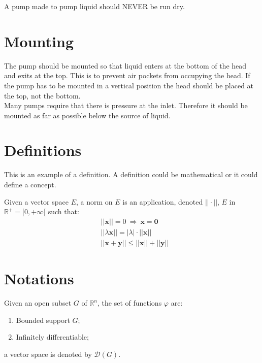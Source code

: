 \documentclass[11pt,fleqn]{book} %
\begin{document}
A pump made to pump liquid should NEVER be run dry.

\section{Mounting}

The pump should be mounted so that liquid enters at the bottom of the head and exits at the top. This is to prevent air pockets from occupying the head. If the pump has to be mounted in a vertical position the head should be placed at the top, not the bottom.\\

Many pumps require that there is pressure at the inlet. Therefore it should be mounted as far as possible below the source of liquid.


\section{Definitions}

This is an example of a definition. A definition could be mathematical or it could define a concept.

\begin{definition}
Given a vector space $E$, a norm on $E$ is an application, denoted $||\cdot||$, $E$ in $\mathbb{R}^+=[0,+\infty[$ such that:
\begin{align}
& ||\mathbf{x}||=0\ \Rightarrow\ \mathbf{x}=\mathbf{0}\\
& ||\lambda \mathbf{x}||=|\lambda|\cdot ||\mathbf{x}||\\
& ||\mathbf{x}+\mathbf{y}||\leq ||\mathbf{x}||+||\mathbf{y}||
\end{align}
\end{definition}


\section{Notations}

\begin{notation}
Given an open subset $G$ of $\mathbb{R}^n$, the set of functions $\varphi$ are:
\begin{enumerate}
\item Bounded support $G$;
\item Infinitely differentiable;
\end{enumerate}
a vector space is denoted by $\mathcal{D}(G)$. 
\end{notation}
\end{document}
